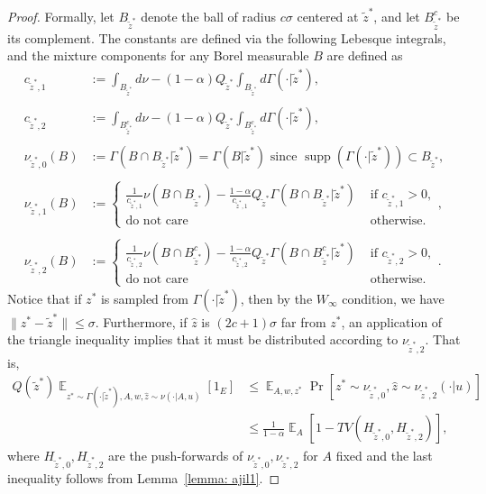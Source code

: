 \documentclass{article}
\newcommand{\norm}[1]{\|#1\|}
\DeclareMathOperator*{\E}{\mathbb{E}}
\DeclareMathOperator{\supp}{supp}
\begin{document}
\begin{proof}
		Formally, let $B_{\tilde{z}^*}$ denote the ball of radius $c
		 \sigma$ centered at $\tilde{z}^*$, and let $B^c_{\tilde{z}^*}$
		be its complement. The constants are defined via the following
		Lebesque integrals, and the mixture components for any Borel
		measurable $B$ are defined as
		\begin{align*}
		  c_{\tilde{z}^*, 1} &:= \int_{B_{\tilde{z}^*}} d\nu - \left( 1- \alpha \right) Q_{\tilde{z}^*} \int_{B_{\tilde{z}^*}} d\Gamma( \cdot | \tilde{z}^*)  ,\\
		  \nonumber\\
		  c_{\tilde{z}^*, 2} &:= \int_{B_{\tilde{z}^*}^c} d\nu - \left( 1- \alpha \right) Q_{\tilde{z}^*} \int_{B_{\tilde{z}^*}^c} d\Gamma( \cdot | \tilde{z}^*)  ,\\
		  \nonumber\\
		  \nu_{\tilde{z}^*, 0}(B) &:= \Gamma( B \cap B_{\tilde{z}^*} | \tilde{z}^*) = \Gamma( B  | \tilde{z}^*) \text{ since } \supp(\Gamma(\cdot | \tilde{z}^*)) \subset B_{\tilde{z}^*}, \\
		  \nonumber\\
		  \nu_{\tilde{z}^*, 1}(B) &:= \begin{cases}
		    \frac{ 1}{c_{\tilde{z}^*, 1}}  \nu( B \cap B_{\tilde{z}^*})  - \frac{ 1 - \alpha }{c_{\tilde{z}^*, 1}} Q_{\tilde{z}^*} \Gamma(  B \cap B_{\tilde{z}^*} | \tilde{z}^*)  & \text{ if } c_{\tilde{z}^*, 1} > 0,\\
		    \text{do not care } & \text{ otherwise.}
		  \end{cases},\\
		  \nonumber\\
		  \nu_{\tilde{z}^*, 2}(B) &:= \begin{cases}
		    \frac{ 1}{c_{\tilde{z}^*, 2}}  \nu( B \cap B^c_{\tilde{z}^*})  - \frac{ 1 - \alpha }{c_{\tilde{z}^*, 2}} Q_{\tilde{z}^*} \Gamma(  B \cap B^c_{\tilde{z}^*} | \tilde{z}^*)  & \text{ if } c_{\tilde{z}^*, 2} > 0,\\ \text{do not care } & \text{ otherwise.}
		  \end{cases}.
		\end{align*}
		Notice that if $z^*$ is sampled from $\Gamma(\cdot | \tilde{z}^*)$, then by the $W_\infty$ condition, we have $\norm{ z^* - \tilde{z}^*} \leq \sigma$. Furthermore, if $\widehat{z}$ is $\left( 2c+1 \right)\sigma $ far from $z^*$, an application of the triangle inequality implies that it must be distributed according to $\nu_{\tilde{z}^*,2}$.
    That is, 
    \begin{align*}
			Q ( \tilde{z}^*) \E_{z^*\sim \Gamma( \cdot | \tilde{z}^*) , A , w, \widehat{z} \sim \nu(\cdot | A,u) } \left[ {1}_E \right] & \leq \E_{A , w, z^*} \Pr \left[ z^* \sim \nu_{\tilde{z}^*,0}, \widehat{z} \sim \nu_{\tilde{z}^*,2}( \cdot | u) \right] \\
			& \leq \frac{1}{1-\alpha}\E_A \left[ 1 - TV( H_{\tilde{z}^*,0}, H_{\tilde{z}^*,2}) \right],
    \end{align*}
    where $H_{\tilde{z}^*,0}, H_{\tilde{z}^*,2}$ are the push-forwards of $\nu_{\tilde{z}^*,0}, \nu_{\tilde{z}^*,2}$ for $A$ fixed and the last inequality follows from Lemma~\ref{lemma: ajil1}.


\end{proof}
\end{document}
